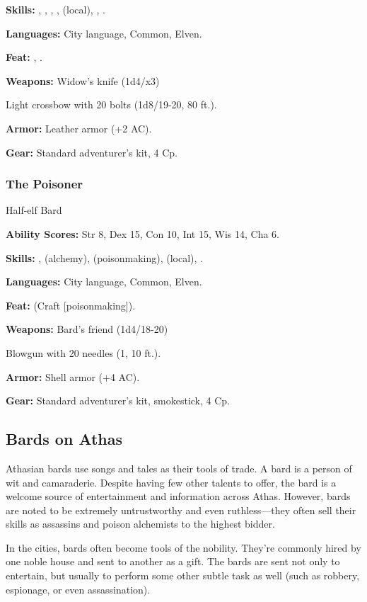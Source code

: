 \textbf{Skills:} , , , ,  (local), , .

\textbf{Languages:} City language, Common, Elven.

\textbf{Feat:} , .

\textbf{Weapons:} Widow's knife (1d4/x3)

Light crossbow with 20 bolts (1d8/19-20, 80 ft.).

\textbf{Armor:} Leather armor (+2 AC).

\textbf{Gear:} Standard adventurer's kit, 4 Cp.

\subsubsection{The Poisoner}
Half-elf Bard

\textbf{Ability Scores:} Str 8, Dex 15, Con 10, Int 15, Wis 14, Cha 6.

\textbf{Skills:} ,  (alchemy),  (poisonmaking),  (local), .

\textbf{Languages:} City language, Common, Elven.

\textbf{Feat:}  (Craft [poisonmaking]).

\textbf{Weapons:} Bard's friend (1d4/18-20)

Blowgun with 20 needles (1, 10 ft.).

\textbf{Armor:} Shell armor (+4 AC).

\textbf{Gear:} Standard adventurer's kit, smokestick, 4 Cp.

\subsection{Bards on Athas}

Athasian bards use songs and tales as their tools of trade. A bard is a person of wit and camaraderie. Despite having few other talents to offer, the bard is a welcome source of entertainment and information across Athas. However, bards are noted to be extremely untrustworthy and even ruthless---they often sell their skills as assassins and poison alchemists to the highest bidder.

In the cities, bards often become tools of the nobility. They're commonly hired by one noble house and sent to another as a gift. The bards are sent not only to entertain, but usually to perform some other subtle task as well (such as robbery, espionage, or even assassination).

